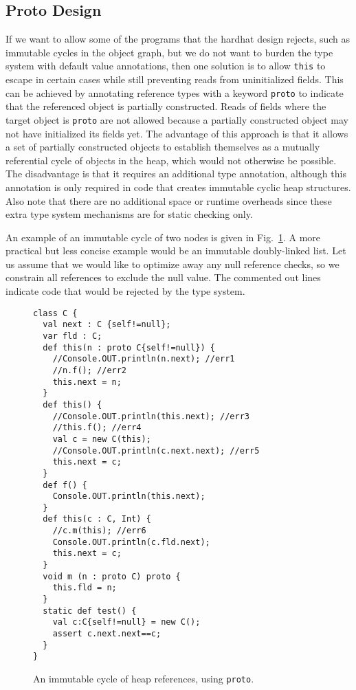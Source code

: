 \subsection{Proto Design}

If we want to allow some of the programs that the hardhat design rejects, such
as immutable cycles in the object graph, but we do not want to burden the type
system with default value annotations, then one solution is to allow
\texttt{this} to escape in certain cases while still preventing reads from
uninitialized fields.  This can be achieved by annotating reference types with
a keyword \texttt{proto} to indicate that the referenced object is partially
constructed.  Reads of fields where the target object is \texttt{proto}
are not allowed because a partially constructed object may not have
initialized its fields yet.  The advantage of this approach is that it allows a set
of partially constructed objects to establish themselves as a mutually
referential cycle of objects in the heap, which would not otherwise be possible.
The disadvantage is that it requires an additional type annotation, although this
annotation is only required in code that creates immutable cyclic heap
structures.  Also note that there are no additional space or runtime overheads
since these extra type system mechanisms are for static checking only.

An example of an immutable cycle of two nodes is given in
Fig.~\ref{Figure:Cyclic}.  A more practical but less concise example would be an
immutable doubly-linked list.  Let us assume that we would like to optimize
away any null reference checks, so we constrain all references to exclude the
null value.  The commented out lines indicate code that would be rejected by
the type system.

\begin{figure}
\vspace{-0.2cm}\begin{lstlisting}
class C {
  val next : C {self!=null};
  var fld : C;
  def this(n : proto C{self!=null}) {
    //Console.OUT.println(n.next); //err1
    //n.f(); //err2
    this.next = n;
  }
  def this() {
    //Console.OUT.println(this.next); //err3
    //this.f(); //err4
    val c = new C(this);
    //Console.OUT.println(c.next.next); //err5
    this.next = c;
  }
  def f() {
    Console.OUT.println(this.next);
  }
  def this(c : C, Int) {
    //c.m(this); //err6
    Console.OUT.println(c.fld.next);
    this.next = c;
  }
  void m (n : proto C) proto {
    this.fld = n;
  }
  static def test() {
    val c:C{self!=null} = new C();
    assert c.next.next==c;
  }
}
\end{lstlisting}\vspace{-0.2cm}
\caption{An immutable cycle of heap references, using \texttt{proto}.}
\label{Figure:Cyclic}
\end{figure}

